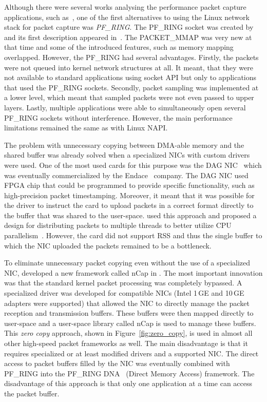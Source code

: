 Although there were several works analysing the performance packet capture applications, such as~\cite{Degioanni-2003-Profiling}, one of the first alternatives to using the Linux network stack for packet capture was \emph{PF\_RING}. The PF\_RING socket was created by \citeauthor{Deri-2004-Improving} and its first description appeared in~\cite{Deri-2004-Improving}. The PACKET\_MMAP was very new at that time and some of the introduced features, such as memory mapping overlapped. However, the PF\_RING had several advantages. Firstly, the packets were not queued into kernel network structures at all. It meant, that they were not available to standard applications using socket API but only to applications that used the PF\_RING sockets. Secondly, packet sampling was implemented at a lower level, which meant that sampled packets were not even passed to upper layers. Lastly, multiple applications were able to simultaneously open several PF\_RING sockets without interference. However, the main performance limitations remained the same as with Linux NAPI.

The problem with unnecessary copying between DMA-able memory and the shared buffer was already solved when a specialized NICs with custom drivers were used. One of the most used cards for this purpose was the DAG NIC~\cite{UniversityWaikato--Dag} which was eventually commercialized by the Endace~\cite{ETL--Endace} company. The DAG NIC used FPGA chip that could be programmed to provide specific functionality, such as high-precision packet timestamping. Moreover, it meant that it was possible for the driver to instruct the card to upload packets in a correct format directly to the buffer that was shared to the user-space. \citeauthor{Degioanni-2004-Introducing} used this approach and proposed a design for distributing packets to multiple threads to better utilize CPU parallelism~\cite{Degioanni-2004-Introducing}. However, the card did not support RSS and thus the single buffer to which the NIC uploaded the packets remained to be a bottleneck.

To eliminate unnecessary packet copying even without the use of a specialized NIC, \citeauthor{Deri-2005-nCap} developed a new framework called nCap in \citeyear{Deri-2005-nCap}. The most important innovation was that the standard kernel packet processing was completely bypassed. A specialized driver was developed for compatible NICs (Intel 1\,GE and 10\,GE adapters were supported) that allowed the NIC to directly manage the packet reception and transmission buffers. These buffers were then mapped directly to user-space and a user-space library called nCap is used to manage these buffers. This \emph{zero copy} approach, shown in Figure~\ref{fig:zero_copy}, is used in almost all other high-speed packet frameworks as well. The main disadvantage is that it requires specialized or at least modified drivers and a supported NIC. The direct access to packet buffers filled by the NIC was eventually combined with PF\_RING into the PF\_RING DNA~\cite{ntop-2010-PFRING} (Direct Memory Access) framework. The disadvantage of this approach is that only one application at a time can access the packet buffer.

